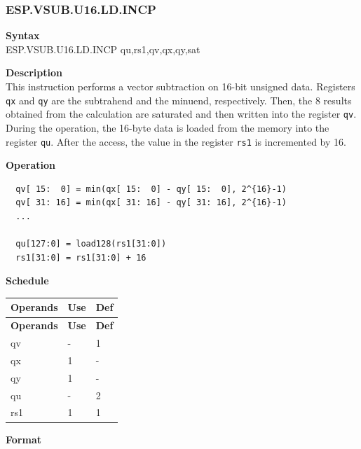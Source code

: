 \newpage
\subsubsection{ESP.VSUB.U16.LD.INCP}\label{instruction:ESPVSUBU16LDINCP}
\textbf{Syntax}\\
ESP.VSUB.U16.LD.INCP qu,rs1,qv,qx,qy,sat

\textbf{Description}\\
This instruction performs a vector subtraction on 16-bit unsigned data. Registers \lstinline{qx} and \lstinline{qy} are the subtrahend and the minuend, respectively. Then, the 8 results obtained from the calculation are saturated and then written into the register \lstinline{qv}. \\ During the operation, the 16-byte data is loaded from the memory into the register \lstinline{qu}. After the access, the value in the register \lstinline{rs1} is incremented by 16.

\textbf{Operation}\\
\begin{lstlisting}
  qv[ 15:  0] = min(qx[ 15:  0] - qy[ 15:  0], 2^{16}-1)
  qv[ 31: 16] = min(qx[ 31: 16] - qy[ 31: 16], 2^{16}-1)
  ...

  qu[127:0] = load128(rs1[31:0])
  rs1[31:0] = rs1[31:0] + 16
\end{lstlisting}


\textbf{Schedule}\\
\begin{longtable}[c]{|l|l|l|}
    \hline
    \rowcolor{lightgray}
    \textbf{Operands} & \textbf{Use} & \textbf{Def} \\\hline
    \endfirsthead
    \hline
    \rowcolor{lightgray}
     \textbf{Operands} & \textbf{Use} & \textbf{Def} \\\hline
    \endhead
    \hline
    \endfoot

  qv & - & 1 \\\hline
    qx & 1 & - \\\hline
    qy & 1 & - \\\hline
    qu & - & 2 \\\hline
    rs1 & 1 & 1

\end{longtable}

\textbf{Format}\\

